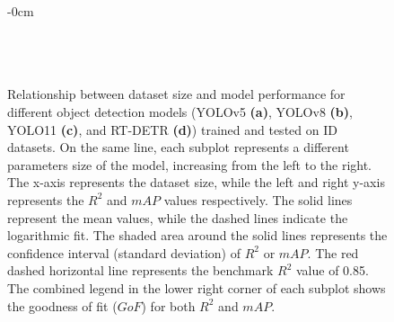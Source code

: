 \documentclass[12pt,a4paper,oneside]{report}
\newlength{\extralength}
\begin{document}
\begin{figure}[H]
  \centering
  \begin{adjustwidth}{-\extralength}{0cm}
  \\
  \\
  \\
  \\
  \caption{Relationship between dataset size and model performance 
  for different object detection models (YOLOv5 \textbf{(a)}, YOLOv8 \textbf{(b)}, 
  YOLO11 \textbf{(c)}, and RT-DETR \textbf{(d)}) trained and tested on ID datasets. 
  On the same line, each subplot represents a different parameters size of the model,
  increasing from the left to the right. The x-axis represents the dataset size, while
  the left and right y-axis represents the $R^2$ and $mAP$ values respectively. 
  The solid lines represent the mean values, while the dashed lines indicate the logarithmic fit.
  The shaded area around the solid lines represents the confidence interval (standard
  deviation) of $R^2$ or $mAP$.
  The red dashed horizontal line represents the benchmark $R^2$ value of 0.85. The combined
  legend in the lower right corner of each subplot shows the goodness of fit ($GoF$) for both $R^2$
  and $mAP$.}
  \label{fig:dataset_size_vs_performance}  
\end{adjustwidth}
\end{figure}
\end{document}
